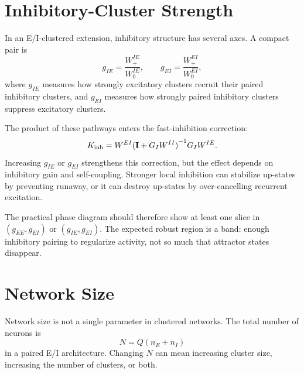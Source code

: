 \section{Inhibitory-Cluster Strength}
\label{sec:phase-inhibitory-cluster-strength}

In an E/I-clustered extension, inhibitory structure has several axes. A compact pair is
%
\begin{equation}
  g_{IE}=\frac{W_{+}^{IE}}{W_{0}^{IE}},
  \qquad
  g_{EI}=\frac{W_{+}^{EI}}{W_{0}^{EI}},
  \label{eq:inhibitory-cluster-strengths}
\end{equation}
%
where $g_{IE}$ measures how strongly excitatory clusters recruit their paired inhibitory clusters, and $g_{EI}$ measures how strongly paired inhibitory clusters suppress excitatory clusters.

The product of these pathways enters the fast-inhibition correction:
%
\begin{equation}
  K_{\mathrm{inh}}
  =
  W^{EI}{(\mathbf{I}+G_I W^{II})}^{-1}G_I W^{IE}.
  \label{eq:inhibitory-correction-strength}
\end{equation}
%
Increasing $g_{IE}$ or $g_{EI}$ strengthens this correction, but the effect depends on inhibitory gain and self-coupling. Stronger local inhibition can stabilize up-states by preventing runaway, or it can destroy up-states by over-cancelling recurrent excitation.

The practical phase diagram should therefore show at least one slice in $(g_{EE},g_{EI})$ or $(g_{IE},g_{EI})$. The expected robust region is a band: enough inhibitory pairing to regularize activity, not so much that attractor states disappear.

\section{Network Size}
\label{sec:phase-network-size}

Network size is not a single parameter in clustered networks. The total number of neurons is
%
\begin{equation}
  N = Q(n_E+n_I)
  \label{eq:total-clustered-network-size}
\end{equation}
%
in a paired E/I architecture. Changing $N$ can mean increasing cluster size, increasing the number of clusters, or both.

